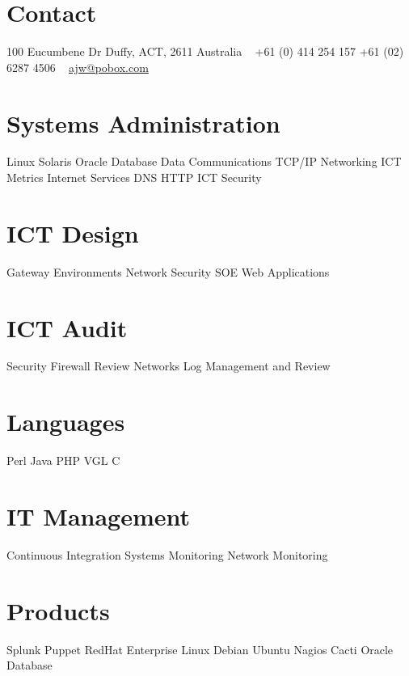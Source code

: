 \documentclass[]{friggeri-cv} %
\begin{document}


\begin{aside} %
\section{Contact}
100 Eucumbene Dr
Duffy, ACT, 2611
Australia
~
+61 (0) 414 254 157
+61 (02) 6287 4506
~
\href{mailto:ajw@pobox.com}{ajw@pobox.com}
\section{Systems Administration}
Linux
Solaris
Oracle Database
Data Communications
TCP/IP Networking
ICT Metrics
Internet Services
DNS
HTTP
ICT Security
\section{ICT Design}
Gateway Environments
Network
Security
SOE
Web Applications
\section{ICT Audit}
Security
Firewall Review
Networks
Log Management and Review
\section{Languages}
Perl
Java
PHP
VGL
C
\section{IT Management}
Continuous Integration
Systems Monitoring
Network Monitoring
\section{Products}
Splunk
Puppet
RedHat Enterprise Linux
Debian
Ubuntu
Nagios
Cacti
Oracle Database

\end{aside}

\end{document}
